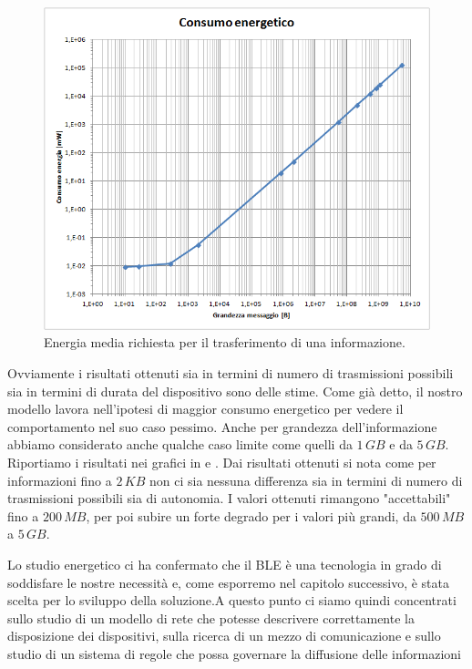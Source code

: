 \begin{figure}[t]
	\centering
	\includegraphics[width=0.8\linewidth]{Images/studio_energetico/cons_en_sing_tx_02}
	\caption[Studio energetico]{Energia media richiesta per il trasferimento di una informazione.}
	\label{fig:cons_en_sing_tx_02}
\end{figure}
Ovviamente i risultati ottenuti sia in termini di numero di trasmissioni possibili sia in termini di durata del dispositivo sono delle stime. Come già detto, il nostro modello lavora nell'ipotesi di maggior consumo energetico per vedere il comportamento nel suo caso pessimo. Anche per grandezza dell'informazione abbiamo considerato anche qualche caso limite come quelli da $1\,GB$ e da $5\,GB$. Riportiamo i risultati nei grafici in  e . Dai risultati ottenuti si nota come per informazioni fino a $2\,KB$ non ci sia nessuna differenza sia in termini di numero di trasmissioni possibili sia di autonomia. I valori ottenuti rimangono "accettabili" fino a $200\,MB$, per poi subire un forte degrado per i valori più grandi, da $500\,MB$ a $5\,GB$.

Lo studio energetico ci ha confermato che il BLE è una tecnologia in grado di soddisfare le nostre necessità e, come esporremo nel capitolo successivo, è stata scelta per lo sviluppo della soluzione.A questo punto ci siamo quindi concentrati sullo studio di un modello di rete che potesse descrivere correttamente la disposizione dei dispositivi, sulla ricerca di un mezzo di comunicazione e sullo studio di un sistema di regole che possa governare la diffusione delle informazioni

